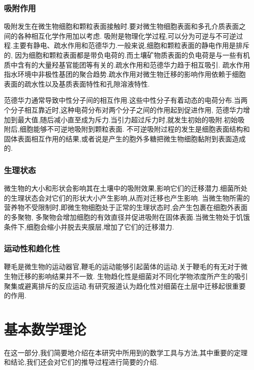 \subsubsection{吸附作用}
吸附发生在微生物细胞和颗粒表面接触时.要对微生物细胞表面和多孔介质表面之间的各种相互化学作用加以考虑.
吸附是物理化学过程,可以分为可逆与不可逆过程.主要有静电、疏水作用和范德华力.一般来说,细胞和颗粒表面的静电作用是排斥的,
因为细胞和颗粒表面都是带负电荷的.而土壤矿物质表面的负电荷是与一些有机质中含有的大量羟基官能团等有关的.疏水作用和范德华力趋于相互吸引.
疏水作用指水环境中非极性基团的聚合趋势.疏水作用对微生物迁移的影响作用依赖于细胞表面的疏水性以及基质表面特性和孔隙溶液特性.\par
范德华力通常导致中性分子间的相互作用.这些中性分子有着动态的电荷分布.当两个分子相互靠近时,这种电荷分布对两个分子之间的作用起到促进作用,
范德华力增加到最大值,随后减小直至成为斥力.当引力超过斥力时,就发生初始的吸附.初始吸附后,细胞能够不可逆地吸附到颗粒表面.
不可逆吸附过程的发生是细胞表面结构和固体表面相互作用的结果,或者说是产生的胞外多糖把微生物细胞黏附到表面造成的.
\subsubsection{生理状态}
微生物的大小和形状会影响其在土壤中的吸附效果,影响它们的迁移潜力.细菌所处的生理状态会对它们的形状大小产生影响,从而对迁移也产生影响.
当微生物所需的营养物不受限制时,即微生物细胞处于正常的生理状态时,会产生包裹在细胞外表面的多聚物,
多聚物会增加细胞的有效直径并促进吸附在固体表面.当微生物处于饥饿条件下,细胞会缩小并脱去夹膜层,增加了它们的迁移潜力.
\subsubsection{运动性和趋化性}
鞭毛是微生物的运动器官,鞭毛的运动能够引起菌体的运动.关于鞭毛的有无对于微生物迁移的影响结果并不一致.
生物趋化性是细菌对不同化学物浓度所产生的吸引聚集或避离排斥的反应运动.有研究报道认为趋化性对细菌在土层中迁移起很重要的作用.
\section{基本数学理论}
在这一部分,我们简要地介绍在本研究中所用到的数学工具与方法,其中重要的定理和结论,我们还会对它们的推导过程进行简要的介绍.
